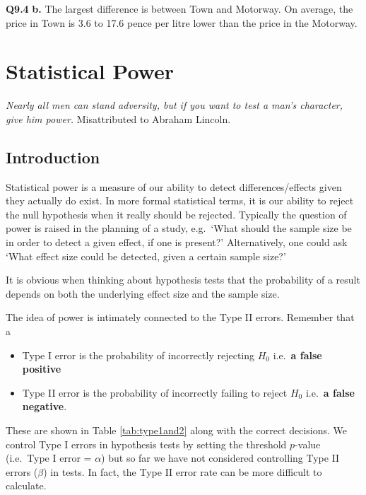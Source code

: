 \documentclass[
  oneside]{krantz}
\providecommand{\tightlist}{%
  \setlength{\itemsep}{0pt}\setlength{\parskip}{0pt}}
\begin{document}
\textbf{Q9.4} \textbf{b.} The largest difference is between Town and Motorway. On average, the price in Town is 3.6 to 17.6 pence per litre lower than the price in the Motorway.

\hypertarget{power}{%
\chapter{Statistical Power}\label{power}}

\emph{Nearly all men can stand adversity, but if you want to test a man's character, give him power.}
Misattributed to Abraham Lincoln.

\hypertarget{INTpower}{%
\section{Introduction}\label{INTpower}}

Statistical power is a measure of our ability to detect differences/effects given they actually do exist. In more formal statistical terms, it is our ability to reject the null hypothesis when it really should be rejected. Typically the question of power is raised in the planning of a study, e.g.~`What should the sample size be in order to detect a given effect, if one is present?' Alternatively, one could ask `What effect size could be detected, given a certain sample size?'

It is obvious when thinking about hypothesis tests that the probability of a result depends on both the underlying effect size and the sample size.

The idea of power is intimately connected to the Type II errors. Remember that a

\begin{itemize}
\tightlist
\item
  Type I error is the probability of incorrectly rejecting \(H_0\) i.e.~\textbf{a false positive}
\item
  Type II error is the probability of incorrectly failing to reject \(H_0\) i.e.~\textbf{a false negative}.
\end{itemize}

These are shown in Table \ref{tab:type1and2} along with the correct decisions.
We control Type I errors in hypothesis tests by setting the threshold \(p\)-value (i.e.~Type I error = \(\alpha\)) but so far we have not considered controlling Type II errors (\(\beta\)) in tests. In fact, the Type II error rate can be more difficult to calculate.
\end{document}
